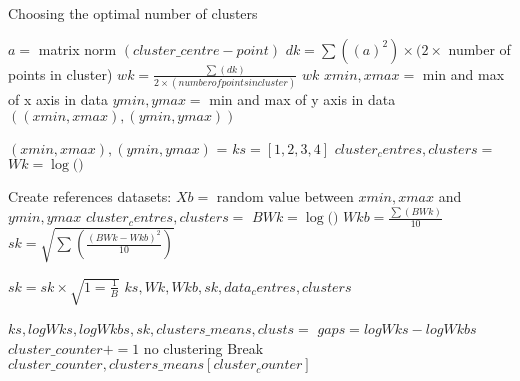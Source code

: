 \begin{algorithm}
\caption{Choosing the optimal number of clusters}
 \begin{algorithmic}[1]
    \Statex
    
    			\State $a = $ matrix norm $(cluster\_centre - point)$    			
    		\EndFor
    		\State $dk = \sum((a)^2 )\times (2 \times $ number of points in cluster)
    	\EndFor
    	\State $wk = \frac{ \sum(dk)}{2 \times (number of points in cluster)} $
    	\State \Return $wk$
    \EndFunction
    \Statex  
    	\State $xmin, xmax = $ min and max of x axis in data
    	\State $ymin, ymax = $ min and max of y axis in data
    	\State \Return $((xmin, xmax), (ymin, ymax)) $
    \EndFunction
    
    \Statex
    	\State $(xmin, xmax), (ymin, ymax)$ = 
    	 	\State $ks = [1,2,3,4]$
   			\State $cluster_centres, clusters = $ 
   			\State $Wk = \log($$)$
   			
   			\State Create references datasets:
   					\State $Xb = $ random value between $xmin, xmax$ and $ymin, ymax$
   				\EndFor
				\State $cluster_centres, clusters = $ 
  				\State $BWk = \log($$)$
   			\EndFor   
   			\State $Wkb = \frac{\sum(BWk)}{10} $	
   			\State $sk = \sqrt{\sum(\frac{(BWk - Wkb)^2}{10})}$	
   				
    	\EndFor
    	\State $sk = sk \times \sqrt{1=\frac{1}{B}}$
    	\State \Return $ks, Wk, Wkb, sk, data_centres, clusters$
    \EndFunction

    \Statex
		    \State $ks, logWks, logWkbs, sk, clusters\_means, clusts = $
		    	\State $gaps = logWks - logWkbs$
		    \EndFor
		    	\State $cluster\_counter += 1$ 
		    		no clustering
		    	\EndIf
		    		\State Break 
		    	\EndIf
		    \EndFor
	\State \Return $cluster\_counter, clusters\_means[cluster_counter]$
	\EndFunction


  \end{algorithmic}
\end{algorithm}

